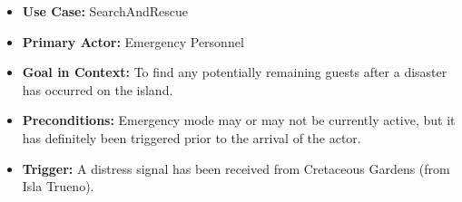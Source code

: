 \documentclass[12pt]{article}
\begin{document}
    \begin{itemize}
        \item[]\textbf{Use Case:}                                
            SearchAndRescue

        \item[]\textbf{Primary Actor:}
            Emergency Personnel

        \item[]\textbf{Goal in Context:}
            To find any potentially remaining guests after a disaster has occurred on the island.
            
        \item[]\textbf{Preconditions:}
            Emergency mode may or may not be currently active, but it has definitely been triggered prior to 
            the arrival of the actor.

        \item[]\textbf{Trigger:}
            A distress signal has been received from Cretaceous Gardens (from Isla Trueno).


\end{itemize}
\end{document}
